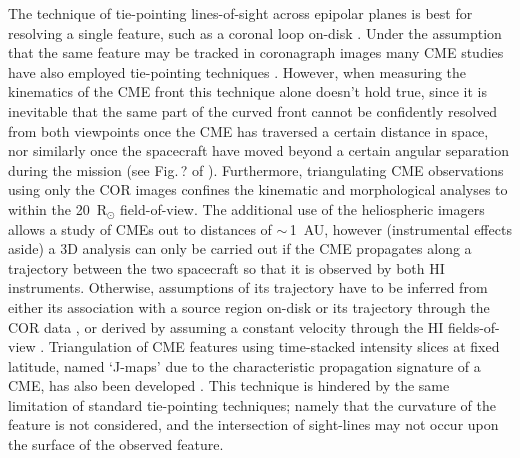 \documentclass[preprint2]{aastex}
\begin{document}
\indent The technique of tie-pointing lines-of-sight across epipolar planes is best for resolving a single feature, such as a coronal loop on-disk \citep{2008ApJ...679..827A}. Under the assumption that the same feature may be tracked in coronagraph images many CME studies have also employed tie-pointing techniques \citep{2009SoPh..256...57L, 2009SoPh..259..213S, 2009SoPh..256..183T, 2008SoPh..252..385M, 2009SoPh..259..163W}. However, when measuring the kinematics of the CME front this technique alone doesn't hold true, since it is inevitable that the same part of the curved front cannot be confidently resolved from both viewpoints once the CME has traversed a certain distance in space, nor similarly once the spacecraft have moved beyond a certain angular separation during the mission (see Fig.\,? of \citep{2006astro.ph.12649I}). Furthermore, triangulating CME observations using only the COR images confines the kinematic and morphological analyses to within the 20~R$_{\odot}$ field-of-view. The additional use of the heliospheric imagers allows a study of CMEs out to distances of $\sim$\,1~AU, however (instrumental effects aside) a 3D analysis can only be carried out if the CME propagates along a trajectory between the two spacecraft so that it is observed by both HI instruments. Otherwise, assumptions of its trajectory have to be inferred from either its association with a source region on-disk \citep{2008SoPh..252..373H} or its trajectory through the COR data \citep{2009SoPh..256..149M}, or derived by assuming a constant velocity through the HI fields-of-view \citep{2009GeoRL..3608102D}. Triangulation of CME features using time-stacked intensity slices at fixed latitude, named `J-maps' due to the characteristic propagation signature of a CME, has also been developed \citep{2010SoPh..tmp...49D, 2010ApJ...710L..82L}. This technique is hindered by the same limitation of standard tie-pointing techniques; namely that the curvature of the feature is not considered, and the intersection of sight-lines may not occur upon the surface of the observed feature.
\end{document}
